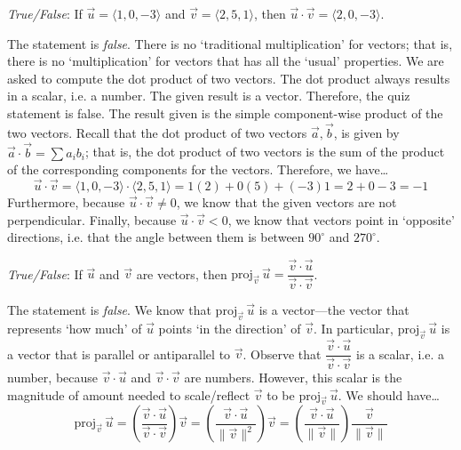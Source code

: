 \documentclass[11pt,letterpaper]{article}
\begin{document}
\quizsol \textit{True/False}: If $\vec{u}= \langle 1, 0, -3 \rangle$ and $\vec{v}= \langle 2, 5, 1 \rangle$, then $\vec{u} \cdot \vec{v}= \langle 2, 0, -3 \rangle$. \pspace

\sol The statement is \textit{false}. There is no `traditional multiplication' for vectors; that is, there is no `multiplication' for vectors that has all the `usual' properties. We are asked to compute the dot product of two vectors. The dot product always results in a scalar, i.e. a number. The given result is a vector. Therefore, the quiz statement is false. The result given is the simple component-wise product of the two vectors.  Recall that the dot product of two vectors $\vec{a}, \vec{b}$, is given by $\vec{a} \cdot \vec{b}= \sum a_i b_i$; that is, the dot product of two vectors is the sum of the product of the corresponding components for the vectors. Therefore, we have\dots
	\[
	\vec{u} \cdot \vec{v}= \langle 1, 0, -3 \rangle \cdot \langle 2, 5, 1 \rangle= 1(2) + 0(5) + (-3)1= 2 + 0 - 3= -1
	\]
Furthermore, because $\vec{u} \cdot \vec{v} \neq 0$, we know that the given vectors are not perpendicular. Finally, because $\vec{u} \cdot \vec{v} < 0$, we know that vectors point in `opposite' directions, i.e. that the angle between them is between $90^\circ$ and $270^\circ$. \pvspace{1.1cm}



\quizsol \textit{True/False}: If $\vec{u}$ and $\vec{v}$ are vectors, then $\text{proj}_{\vec{v}}\, \vec{u}= \dfrac{\vec{v} \cdot \vec{u}}{\vec{v} \cdot \vec{v}}$. \pspace

\sol The statement is \textit{false}. We know that $\text{proj}_{\vec{v}}\, \vec{u}$ is a vector---the vector that represents `how much' of $\vec{u}$ points `in the direction' of $\vec{v}$. In particular, $\text{proj}_{\vec{v}}\, \vec{u}$ is a vector that is parallel or antiparallel to $\vec{v}$. Observe that $\dfrac{\vec{v} \cdot \vec{u}}{\vec{v} \cdot \vec{v}}$ is a scalar, i.e. a number, because $\vec{v} \cdot \vec{u}$ and $\vec{v} \cdot \vec{v}$ are numbers. However, this scalar is the magnitude of amount needed to scale/reflect $\vec{v}$ to be $\text{proj}_{\vec{v}}\, \vec{u}$. We should have\dots
	\[
	\text{proj}_{\vec{v}}\, \vec{u}= \left( \dfrac{\vec{v} \cdot \vec{u}}{\vec{v} \cdot \vec{v}} \right) \vec{v}=  \left( \dfrac{\vec{v} \cdot \vec{u}}{\| \vec{v} \|^2} \right) \vec{v}= \left( \dfrac{\vec{v} \cdot \vec{u}}{\| \vec{v} \|} \right) \dfrac{\vec{v}}{\|\vec{v}\|}
	\] \pvspace{0.8cm}
\end{document}

